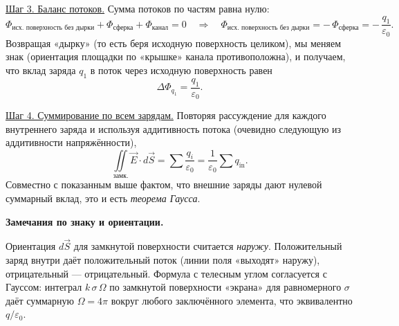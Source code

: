 \documentclass[12pt, a4paper]{article}%
\begin{document}
\underline{Шаг 3. Баланс потоков.} Сумма потоков по частям равна нулю:
\[
\Phi_{\text{исх. поверхность без дырки}} + \Phi_{\text{сферка}} + \Phi_{\text{канал}}=0
\quad \Longrightarrow\quad 
\Phi_{\text{исх. поверхность без дырки}} = -\,\Phi_{\text{сферка}} = -\,\frac{q_1}{\varepsilon_0}.
\]
Возвращая «дырку» (то есть беря исходную поверхность целиком), мы меняем знак (ориентация площадки по «крышке» канала противоположна), и получаем, что вклад заряда $q_1$ в поток через исходную поверхность равен \[\Delta\Phi_{q_1} = \frac{q_1}{\varepsilon_0}.\]

\underline{Шаг 4. Суммирование по всем зарядам.} Повторяя рассуждение для каждого внутреннего заряда и используя аддитивность потока (очевидно следующую из аддитивности напряжённости),
\[
\iint\limits_{\text{замк.}} \vec E\cdot d\vec S=\sum \frac{q_i}{\varepsilon_0}=\frac{1}{\varepsilon_0}\sum q_{\text{in}}.
\]
Совместно с показанным выше фактом, что внешние заряды дают нулевой суммарный вклад, это и есть \textit{теорема Гаусса}.

\textbf{Замечания по знаку и ориентации.}

Ориентация $d\vec S$ для замкнутой поверхности считается \emph{наружу}. Положительный заряд внутри даёт положительный поток (линии поля «выходят» наружу), отрицательный — отрицательный. Формула с телесным углом согласуется с Гауссом: интеграл $k\,\sigma\,\Omega$ по замкнутой поверхности «экрана» для равномерного $\sigma$ даёт суммарную $\Omega=4\pi$ вокруг любого заключённого элемента, что эквивалентно $q/\varepsilon_0$.
\end{document}

